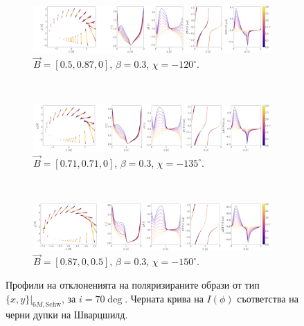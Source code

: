 \begin{figure}[!htb]
	\begin{subfigure}{12cm}
		\hspace{-0.5cm}
		\includegraphics[scale = 0.13]{WH_delta_fig_B_0.5_0.87_0_70_deg_r6.png}
		\caption{$\vec{B} = [0.5, 0.87, 0]$, $\beta = 0.3$, $\chi = -120^\circ$.} 
	\end{subfigure}\\
	\begin{subfigure}{12cm}
		\hspace{-0.5cm}
		\includegraphics[scale = 0.13]{WH_delta_fig_B_0.71_0.71_0_70_deg_r6.png}
		\caption{$\vec{B} = [0.71, 0.71, 0]$, $\beta = 0.3$, $\chi = -135^\circ$.}
	\end{subfigure}\\
	\begin{subfigure}{12cm}
		\hspace{-0.5cm}
		\includegraphics[scale = 0.13]{WH_delta_fig_B_0.87_0.5_0_70_deg_r6.png}
		\caption{$\vec{B} = [0.87, 0, 0.5]$, $\beta = 0.3$, $\chi = -150^\circ$.}
	\end{subfigure}
	\caption[Профили на отклоненията на поляризираните образи oт тип $\{x,y\}\vert_{6M, \text{Schw}}$, за $i = 70\deg$.]{\small Профили на отклоненията на поляризираните образи от тип $\{x,y\}\vert_{6M, \text{Schw}}$, за $i = 70\deg$. Черната крива на $I(\phi)$ съответства на черни дупки на Шварцшилд.} 
	\label{WH_delta_r6_70_deg}
\end{figure}

